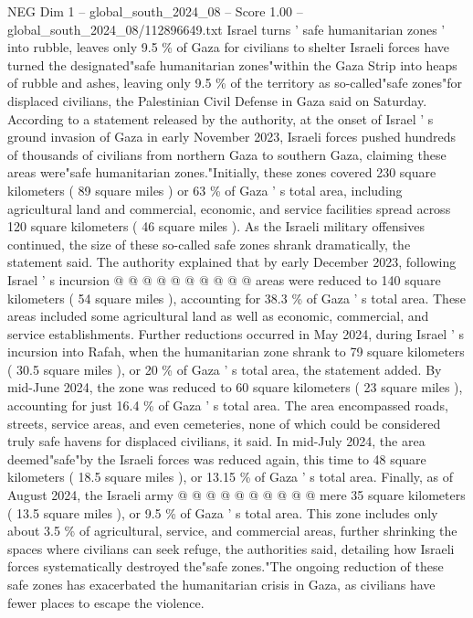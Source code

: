 \begin{textsample}{NEG Dim 1 – global\_south\_2024\_08 – Score 1.00 – global\_south\_2024\_08/112896649.txt}  \label{ex:f1_neg_442}
Israel turns ' safe humanitarian zones ' into rubble, leaves only 9.5 \% of Gaza for civilians to shelter Israeli forces have turned the designated"safe humanitarian zones"within the Gaza Strip into heaps of rubble and ashes, leaving only 9.5 \% of the territory as so-called"safe zones"for displaced civilians, the Palestinian Civil Defense in Gaza said on Saturday.
According to a statement released by the authority, at the onset of Israel ' s ground invasion of Gaza in early November 2023, Israeli forces pushed hundreds of thousands of civilians from northern Gaza to southern Gaza, claiming these areas were"safe humanitarian zones."Initially, these zones covered 230 square kilometers ( 89 square miles ) or 63 \% of Gaza ' s total area, including agricultural land and commercial, economic, and service facilities spread across 120 square kilometers ( 46 square miles ).
As the Israeli military offensives continued, the size of these so-called safe zones shrank dramatically, the statement said.
The authority explained that by early December 2023, following Israel ' s incursion @ @ @ @ @ @ @ @ @ @ areas were reduced to 140 square kilometers ( 54 square miles ), accounting for 38.3 \% of Gaza ' s total area.
These areas included some agricultural land as well as economic, commercial, and service establishments.
Further reductions occurred in May 2024, during Israel ' s incursion into Rafah, when the humanitarian zone shrank to 79 square kilometers ( 30.5 square miles ), or 20 \% of Gaza ' s total area, the statement added.
By mid-June 2024, the zone was reduced to 60 square kilometers ( 23 square miles ), accounting for just 16.4 \% of Gaza ' s total area.
The area encompassed roads, streets, service areas, and even cemeteries, none of which could be considered truly safe havens for displaced civilians, it said.
In mid-July 2024, the area deemed"safe"by the Israeli forces was reduced again, this time to 48 square kilometers ( 18.5 square miles ), or 13.15 \% of Gaza ' s total area.
Finally, as of August 2024, the Israeli army @ @ @ @ @ @ @ @ @ @ mere 35 square kilometers ( 13.5 square miles ), or 9.5 \% of Gaza ' s total area.
This zone includes only about 3.5 \% of agricultural, service, and commercial areas, further shrinking the spaces where civilians can seek refuge, the authorities said, detailing how Israeli forces systematically destroyed the"safe zones."The ongoing reduction of these safe zones has exacerbated the humanitarian crisis in Gaza, as civilians have fewer places to escape the violence.

\end{textsample}
